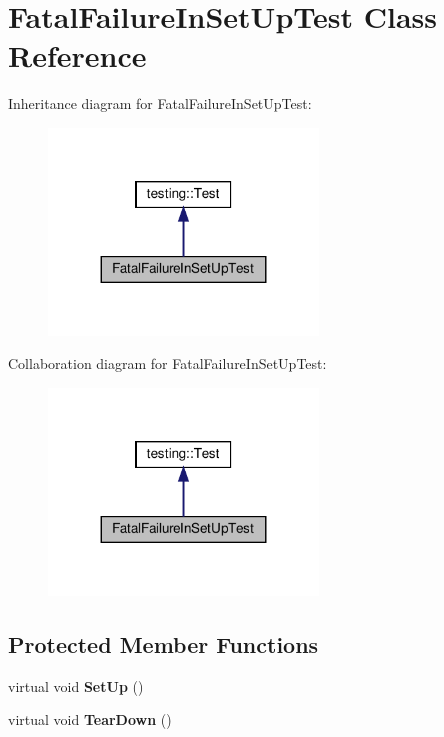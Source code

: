 \hypertarget{class_fatal_failure_in_set_up_test}{}\section{Fatal\+Failure\+In\+Set\+Up\+Test Class Reference}
\label{class_fatal_failure_in_set_up_test}


Inheritance diagram for Fatal\+Failure\+In\+Set\+Up\+Test\+:
\nopagebreak
\begin{figure}[H]
\begin{center}
\leavevmode
\includegraphics[width=203pt]{class_fatal_failure_in_set_up_test__inherit__graph}
\end{center}
\end{figure}


Collaboration diagram for Fatal\+Failure\+In\+Set\+Up\+Test\+:
\nopagebreak
\begin{figure}[H]
\begin{center}
\leavevmode
\includegraphics[width=203pt]{class_fatal_failure_in_set_up_test__coll__graph}
\end{center}
\end{figure}
\subsection*{Protected Member Functions}
\begin{DoxyCompactItemize}
\item 
\mbox{\label{class_fatal_failure_in_set_up_test_a455696f86fb5f5393624221ccb79b373}} 
virtual void {\bfseries Set\+Up} ()
\item 
\mbox{\label{class_fatal_failure_in_set_up_test_a457707161063e08f7b6600ec5db449e4}} 
virtual void {\bfseries Tear\+Down} ()
\end{DoxyCompactItemize}
